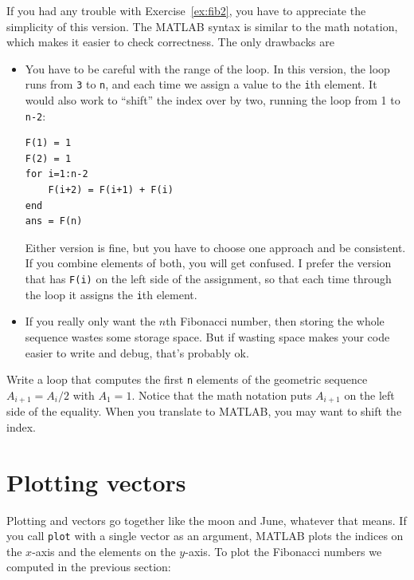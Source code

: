 \documentclass[
]{book}
\begin{document}
If you had any trouble with Exercise~\ref{ex:fib2}, you have to
appreciate the simplicity of this version.  The MATLAB syntax is
similar to the math notation, which makes it easier to check
correctness.  The only drawbacks are

\begin{itemize}

\item You have to be careful with the range of the
loop.  In this version, the loop runs from {\tt 3} to {\tt n},
and each time we assign a value to the {\tt i}th element.  It
would also work to ``shift'' the index over by two,
running the loop from 1 to {\tt n-2}:

\begin{verbatim}
F(1) = 1
F(2) = 1
for i=1:n-2
    F(i+2) = F(i+1) + F(i)
end
ans = F(n)
\end{verbatim}

Either version is fine, but you have to choose one approach
and be consistent.  If you combine elements of both, you will
get confused.  I prefer the version that has {\tt F(i)} on the
left side of the assignment, so that each time through the loop
it assigns the {\tt i}th element.

\item If you really only want the $n$th Fibonacci number, then storing
the whole sequence wastes some storage space.  But if wasting space
makes your code easier to write and debug, that's probably ok.

\end{itemize}

\begin{ex}
Write a loop that computes the first {\tt n} elements
of the geometric sequence $A_{i+1} = A_i/2$ with $A_1 = 1$.  Notice that
the math notation puts $A_{i+1}$ on the left side of the equality.
When you translate to MATLAB, you may want to shift the index.
\end{ex}


\section{Plotting vectors}

Plotting and vectors go together like the moon and June, whatever that
means.  If you call {\tt plot} with a single vector as an argument,
MATLAB plots the indices on the $x$-axis and the elements on the
$y$-axis.  To plot the Fibonacci numbers we computed in the previous
section:
\end{document}
